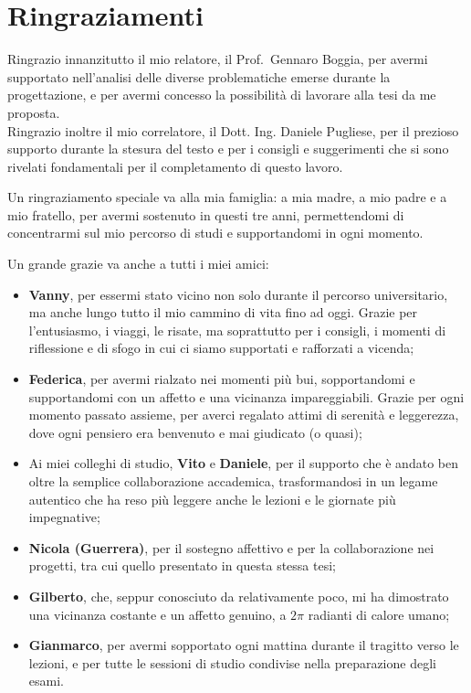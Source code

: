 \chapter*{Ringraziamenti}

Ringrazio innanzitutto il mio relatore, il Prof.\ Gennaro Boggia, per avermi supportato nell’analisi delle diverse problematiche emerse durante la progettazione, e per avermi concesso la possibilità di lavorare alla tesi da me proposta. \\
Ringrazio inoltre il mio correlatore, il Dott. Ing. Daniele Pugliese, per il prezioso supporto durante la stesura del testo e per i consigli e suggerimenti che si sono rivelati fondamentali per il completamento di questo lavoro.

\vspace{1em}
Un ringraziamento speciale va alla mia famiglia: a mia madre, a mio padre e a mio fratello, per avermi sostenuto in questi tre anni, permettendomi di concentrarmi sul mio percorso di studi e supportandomi in ogni momento.

\vspace{1em}
Un grande grazie va anche a tutti i miei amici:
\begin{itemize}
    \item \textbf{Vanny}, per essermi stato vicino non solo durante il percorso universitario, ma anche lungo tutto il mio cammino di vita fino ad oggi. Grazie per l’entusiasmo, i viaggi, le risate, ma soprattutto per i consigli, i momenti di riflessione e di sfogo in cui ci siamo supportati e rafforzati a vicenda;
    \item \textbf{Federica}, per avermi rialzato nei momenti più bui, sopportandomi e supportandomi con un affetto e una vicinanza impareggiabili. Grazie per ogni momento passato assieme, per averci regalato attimi di serenità e leggerezza, dove ogni pensiero era benvenuto e mai giudicato (o quasi);
    \item Ai miei colleghi di studio, \textbf{Vito} e \textbf{Daniele}, per il supporto che è andato ben oltre la semplice collaborazione accademica, trasformandosi in un legame autentico che ha reso più leggere anche le lezioni e le giornate più impegnative;
    \item \textbf{Nicola (Guerrera)}, per il sostegno affettivo e per la collaborazione nei progetti, tra cui quello presentato in questa stessa tesi;
    \item \textbf{Gilberto}, che, seppur conosciuto da relativamente poco, mi ha dimostrato una vicinanza costante e un affetto genuino, a $2\pi$ radianti di calore umano;
    \item \textbf{Gianmarco}, per avermi sopportato ogni mattina durante il tragitto verso le lezioni, e per tutte le sessioni di studio condivise nella preparazione degli esami.
\end{itemize}

